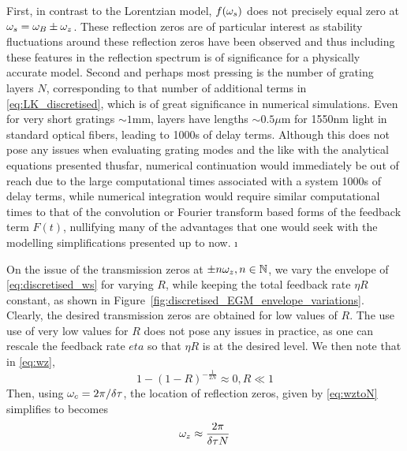 First, in contrast to the Lorentzian model, $f(\omega_s)$ does not precisely equal zero at $\omega_s = \omega_B \pm \omega_z$. 
These reflection zeros are of particular interest as stability fluctuations around these reflection zeros have been observed and thus including these features in the reflection spectrum is of significance for a physically accurate model. 
Second and perhaps most pressing is the number of grating layers $N$, corresponding to that number of additional terms in \eqref{eq:LK_discretised}, which is of great significance in numerical simulations. 
Even for very short gratings $\sim 1\text{mm}$, layers have lengths $\sim 0.5\mu\text{m}$ for 1550nm light in standard optical fibers, leading to 1000s of delay terms. 
Although this does not pose any issues when evaluating grating modes and the like with the analytical equations presented thusfar, 
numerical continuation would immediately be out of reach due to the large computational times associated with a system 1000s of delay terms, 
while numerical integration would require similar computational times to that of the convolution or Fourier transform based forms of the feedback term $F(t)$, 
nullifying many of the advantages that one would seek with the modelling simplifications presented up to now. 
ı%
\par
%
On the issue of the transmission zeros at $\pm n \omega_z, n \in \mathbb{N}$, we vary the envelope of \eqref{eq:discretised_ws} for varying $R$, 
while keeping the total feedback rate $\eta R$ constant, as shown in Figure~\ref{fig:discretised_EGM_envelope_variations}. 
Clearly, the desired transmission zeros are obtained for low values of $R$. 
The use use of very low values for $R$ does not pose any issues in practice, as one can rescale the feedback rate $eta$ so that $\eta R$ is at the desired level. 
We then note that in \eqref{eq:wz},
%
\begin{equation*}
    1-(1-R)^{-\frac{1}{2N}} \approx 0, R\ll1
\end{equation*}
%
Then, using $\omega_c = 2\pi/\delta \tau$, the location of reflection zeros, given by \eqref{eq:wztoN} simplifies to becomes
%
\begin{equation}
    \label{eq:wz_approx}
    \omega_z \approx \frac{2\pi}{\delta \tau N}
\end{equation}
%
